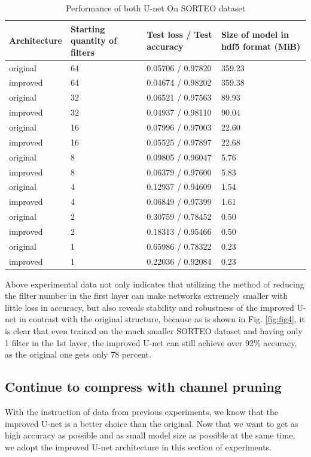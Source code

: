 \documentclass[sigconf]{acmart}
\begin{document}
\begin{table}
 \caption{Performance of both U-net On SORTEO dataset}
  \centering
  \begin{tabular}{llll}
    \toprule
    Architecture & Starting quantity of filters & Test loss / Test accuracy  & Size of model in hdf5 format (MiB) \\
    \midrule
    original & 64 & 0.05706 / 0.97820 & 359.23 \\
    \midrule
    improved & 64 & 0.04674 / 0.98202 & 359.38 \\
    \midrule
    original & 32 & 0.06521 / 0.97563 & 89.93 \\
    \midrule
    improved & 32 & 0.04937 / 0.98110 & 90.04 \\
    \midrule
    original & 16 & 0.07996 / 0.97003 & 22.60 \\
    \midrule
    improved & 16 & 0.05525 / 0.97897 & 22.68 \\
    \midrule
    original &  8 & 0.09805 / 0.96047 & 5.76 \\
    \midrule
    improved &  8 & 0.06379 / 0.97600 & 5.83 \\
    \midrule
    original &  4 & 0.12937 / 0.94609 & 1.54 \\
    \midrule
    improved &  4 & 0.06849 / 0.97399 & 1.61\\
    \midrule
    original &  2 & 0.30759 / 0.78452 & 0.50 \\
    \midrule
    improved &  2 & 0.18313 / 0.95466 & 0.50\\
    \midrule
    original &  1 & 0.65986 / 0.78322 & 0.23 \\
    \midrule
    improved &  1 & 0.22036 / 0.92084 & 0.23\\
    \bottomrule
  \end{tabular}
  \label{tab:table2}
\end{table}

Above experimental data not only indicates that utilizing the method of reducing the filter number in the first layer can make networks extremely smaller with little loss in accuracy, but also reveals stability and robustness of the improved U-net in contrast with the original structure, because as is shown in Fig. \ref{fig:fig4}, it is clear that even trained on the much smaller SORTEO dataset and having only 1 filter in the 1st layer, the improved U-net can still achieve over 92\% accuracy, as the original one gets only 78 percent. 

\subsection{Continue to compress with channel pruning}
With the instruction of data from previous experiments, we know that the improved U-net is a better choice than the original. Now that we want to get as high accuracy as possible and as small model size as possible at the same time, we adopt the improved U-net architecture in this section of experiments. 
\end{document}
